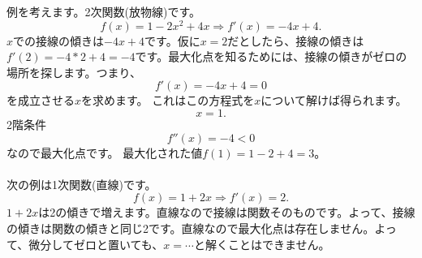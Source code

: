 \begin{frame}[t]{}
\begin{columns}[T]
\column{.45\paperwidth}
例を考えます。2次関数(放物線)です。
\[
f(x)=1-2x^{2}+4x \Rightarrow f'(x)=-4x+4.
\]
\pause
$x$での接線の傾きは$-4x+4$です。仮に$x=2$だとしたら、接線の傾きは$f'(2)=-4*2+4=-4$です。最大化点を知るためには、接線の傾きがゼロの場所を探します。つまり、
\[
f'(x)=-4x+4=0
\]
を成立させる$x$を求めます。\pause
これはこの方程式を$x$について解けば得られます。
\[
x=1.
\]
\column{.45\paperwidth}
2階条件
\[
f''(x)=-4<0
\]
なので最大化点です。
最大化された値$f(1)=1-2+4=3$。%
\\~\\
\pause
次の例は1次関数(直線)です。
\[
f(x)=1+2x \Rightarrow f'(x)=2.
\]
\pause
$1+2x$は2の傾きで増えます。直線なので接線は関数そのものです。よって、接線の傾きは関数の傾きと同じ2です。直線なので最大化点は存在しません。よって、微分してゼロと置いても、$x=\cdots$と解くことはできません。
\end{columns}
\end{frame}

